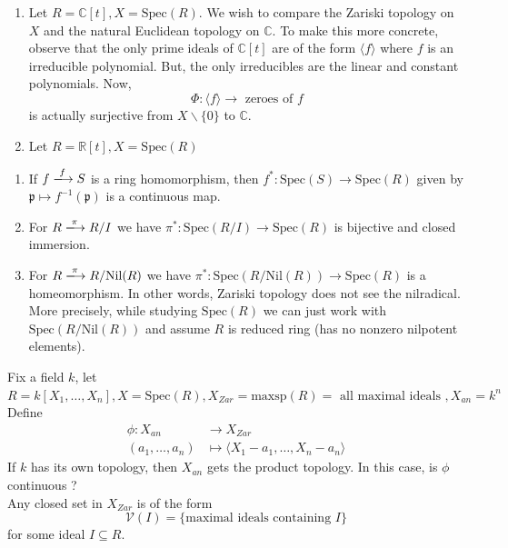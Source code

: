 \documentclass[oneside, 12pt]{scrbook}
\newcommand{\CC}{\mathbb C}
\newcommand{\RR}{\mathbb R}
\newcommand{\V}{\mathcal{V}}
\newcommand{\spec}{\mathrm{Spec}}
\newcommand{\pr}{\mathfrak{p}}
\newcommand{\nil}{\mathrm{Nil}}
\newcommand{\bs}{\backslash}
\theoremstyle{theorem}
\begin{document}
\begin{example}
\begin{enumerate}
\item Let $R= \CC[t], X = \spec(R)$. We wish to compare the Zariski topology on $X$ and the natural Euclidean topology on $\CC$. To make this more concrete, observe that the only prime ideals of $\CC[t]$ are of the form $\langle f \rangle$ where $f$ is an irreducible polynomial. But, the only irreducibles are the linear and constant polynomials. Now, $$\Phi : \langle f \rangle \longrightarrow \text{ zeroes of }f$$ is actually surjective from $X\bs \{0\}$ to $\CC$.
\item Let $R = \RR[t], X = \spec(R)$ 
\end{enumerate}
\end{example}

\begin{remark}
\begin{enumerate}
\item If $f \xlongrightarrow{f} S$ is a ring homomorphism, then $f^* : \spec(S) \rightarrow \spec(R)$ given by $\pr \mapsto f^{-1}(\pr)$ is a continuous map.
\item For $R \xlongrightarrow{\pi} R/I$ we have $\pi^* : \spec(R/I) \rightarrow \spec(R)$ is bijective and closed immersion.
\item For $R \xlongrightarrow{\pi} R/\nil(R)$ we have $\pi^* : \spec(R/\nil(R)) \rightarrow \spec(R)$ is a homeomorphism. In other words, Zariski topology does not see the nilradical. More precisely, while studying $\spec(R)$ we can just work with $\spec(R/\nil(R))$ and assume $R$ is reduced ring (has no nonzero nilpotent elements).
\end{enumerate}
\end{remark}

Fix a field $k$, let $R = k[X_{1}, \hdots , X_{n}], X = \spec(R), X_{Zar} = \mathrm{maxsp}(R)= \text{ all maximal ideals }, X_{an} = k^n$ \\
Define 
\begin{align*}
\phi : X_{an} &\longrightarrow X_{Zar} \\
(a_{1}, \hdots , a_{n}) &\mapsto \langle X_{1}-a_{1}, \hdots , X_{n} - a_{n}\rangle
\end{align*}
If $k$ has its own topology, then $X_{an}$ gets the product topology. In this case, is $\phi$ continuous ? \\

Any closed set in $X_{Zar}$ is of the form $$\V(I) = \{\text{maximal ideals containing } I\}$$ for some ideal $I \subseteq R$. \\
\end{document}
